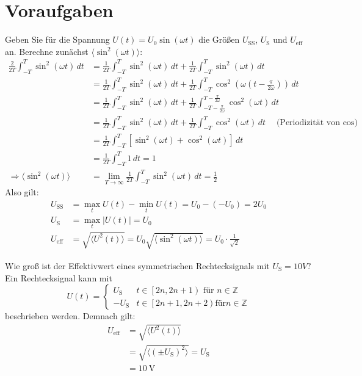 \documentclass[ngerman]{scrartcl}
\theoremstyle{definition}
\begin{document}
	\section{Voraufgaben}
		\begin{voraufgabe}{Geben Sie für die Spannung $U(t) = U_0 \sin(\omega t)$ die Größen $U_\mathrm{SS}$, $U_\mathrm{S}$ und $U_\mathrm{eff}$ an.}
			Berechne zunächst $\langle \sin^2(\omega t) \rangle$:
			\begin{align*}
    \frac{2}{2T}\int_{-T}^T \sin^2(\omega t)\,dt 
    &= \frac{1}{2T}\int_{-T}^T \sin^2(\omega t)\,dt + \frac{1}{2T}\int_{-T}^T \sin^2(\omega t)\,dt \\
    &= \frac{1}{2T}\int_{-T}^T \sin^2(\omega t)\,dt + \frac{1}{2T}\int_{-T}^T \cos^2\left(\omega\left(t - \frac{\pi}{2\omega}\right)\right)\,dt \\
    &= \frac{1}{2T}\int_{-T}^T \sin^2(\omega t)\,dt + \frac{1}{2T}\int_{-T - \frac{\pi}{2\omega}}^{T - \frac{\pi}{2\omega}} \cos^2(\omega t)\,dt \\
    &= \frac{1}{2T}\int_{-T}^T \sin^2(\omega t)\,dt + \frac{1}{2T}\int_{-T}^{T} \cos^2(\omega t)\,dt \quad \text{(Periodizität von $\cos$)} \\
    &= \frac{1}{2T}\int_{-T}^T \left[\sin^2(\omega t) + \cos^2(\omega t)\right]\,dt \\
    &= \frac{1}{2T}\int_{-T}^T 1\,dt = 1 \\
    \Rightarrow \langle \sin^2(\omega t) \rangle &= \lim_{T \to \infty} \frac{1}{2T}\int_{-T}^T \sin^2(\omega t)\,dt = \frac{1}{2}
\end{align*}
Also gilt:
\begin{align*}
    U_\mathrm{SS} &= \max_t U(t) - \min_t U(t) = U_0 - (-U_0) = 2U_0 \\
    U_\mathrm{S} &= \max_t |U(t)| = U_0 \\
    U_\mathrm{eff} &= \sqrt{\langle U^2(t) \rangle} = U_0 \sqrt{\langle \sin^2(\omega t) \rangle} = U_0 \cdot \frac{1}{\sqrt{2}}
\end{align*}
		\end{voraufgabe}		
		\begin{voraufgabe}{Wie groß ist der Effektivwert eines symmetrischen Rechtecksignals mit $U_\mathrm{S} = 10 V?$}
			Ein Rechtecksignal kann mit 
			\begin{equation*}
				 U(t) = \begin{cases}
				U_\mathrm{S} & t \in \left[2n,2n+1\right) \text{ für } n \in \mathbb{Z}\\
				-U_\mathrm{S} & t \in \left[2n+1,2n+2\right) \mathrm{für} n \in \mathbb{Z}
			\end{cases}
			\end{equation*}
			beschrieben werden. Demnach gilt:
			\begin{align*}
				U_\mathrm{eff} &= \sqrt{\langle U^2(t) \rangle} \\
				&= \sqrt{\langle (\pm U_\mathrm{S})^2 \rangle}= U_\mathrm{S} \\
				&= \SI{10}{\volt}
			\end{align*}
		\end{voraufgabe}	
\end{document}
